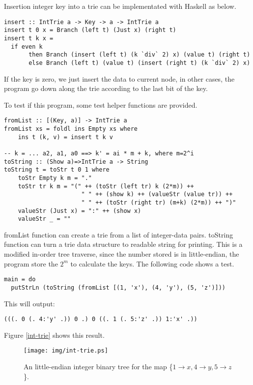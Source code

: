\documentclass{article}
\begin{document}
Insertion integer key into a trie can be implementated with Haskell as below.

\lstset{language=Haskell}
\begin{lstlisting}
insert :: IntTrie a -> Key -> a -> IntTrie a
insert t 0 x = Branch (left t) (Just x) (right t)
insert t k x = 
  if even k
       then Branch (insert (left t) (k `div` 2) x) (value t) (right t)
       else Branch (left t) (value t) (insert (right t) (k `div` 2) x)
\end{lstlisting}

If the key is zero, we just insert the data to current node, in other
cases, the program go down along the trie according to the last bit
of the key.

To test if this program, some test helper functions are provided.

\begin{lstlisting}
fromList :: [(Key, a)] -> IntTrie a
fromList xs = foldl ins Empty xs where
    ins t (k, v) = insert t k v

-- k = ... a2, a1, a0 ==> k' = ai * m + k, where m=2^i
toString :: (Show a)=>IntTrie a -> String
toString t = toStr t 0 1 where
    toStr Empty k m = "."
    toStr tr k m = "(" ++ (toStr (left tr) k (2*m)) ++
                      " " ++ (show k) ++ (valueStr (value tr)) ++
                      " " ++ (toStr (right tr) (m+k) (2*m)) ++ ")"
    valueStr (Just x) = ":" ++ (show x)
    valueStr _ = ""
\end{lstlisting}

fromList function can create a trie from a list of integer-data pairs.
toString function can turn a trie data structure to readable string
for printing. This is a modified in-order tree traverse, since the number
stored is in little-endian, the program store the $2^m$ to calculate
the keys. The following code shows a test.

\begin{lstlisting}
main = do
  putStrLn (toString (fromList [(1, 'x'), (4, 'y'), (5, 'z')]))
\end{lstlisting}

This will output:
\begin{verbatim}
(((. 0 (. 4:'y' .)) 0 .) 0 ((. 1 (. 5:'z' .)) 1:'x' .))
\end{verbatim}

Figure \ref{int-trie} shows this result. 
\begin{figure}[htbp]
       \begin{center}
	\texttt{[image: img/int-trie.ps]}
        \caption{An little-endian integer binary tree for the map \{$ 1 \rightarrow x, 4 \rightarrow y, 5 \rightarrow z$\}.} \label{fig:int-trie}
       \end{center}
\end{figure}
\end{document}
